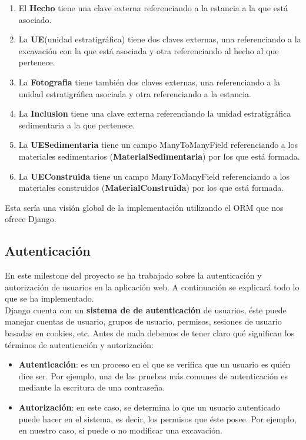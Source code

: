         \begin{enumerate}
            \item El \textbf{Hecho} tiene una clave externa referenciando a la estancia a la
            que está asociado.
            \item La \textbf{UE}(unidad estratigráfica) tiene dos claves externas, una
            referenciando a la excavación con la que está asociada y otra referenciando al
            hecho al que pertenece.
            \item La \textbf{Fotografia} tiene también dos claves externas, una referenciando
            a la unidad estratigráfica asociada y otra referenciando a la estancia.
            \item La \textbf{Inclusion} tiene una clave externa referenciando la unidad
            estratigráfica sedimentaria a la que pertenece.
            \item La \textbf{UESedimentaria} tiene un campo ManyToManyField referenciando a
            los materiales sedimentarios (\textbf{MaterialSedimentaria}) por los que está
            formada.
            \item La \textbf{UEConstruida} tiene un campo ManyToManyField referenciando a
            los materiales construidos (\textbf{MaterialConstruida}) por los que está
            formada.
        \end{enumerate}

    Esta sería una visión global de la implementación utilizando el ORM que nos ofrece Django.

\subsection{Autenticación}
En este milestone del proyecto se ha trabajado sobre la autenticación y autorización de
usuarios en la aplicación web. A continuación se explicará todo lo que se ha
implementado.\\

Django cuenta con un \textbf{sistema de de autenticación} \cite{django-auth} de usuarios,
éste puede manejar cuentas de usuario, grupos de usuario, permisos, sesiones de usuario
basadas en cookies, etc. Antes de nada debemos de tener claro qué significan los términos
de autenticación y autorización:

    \begin{itemize}
        \item \textbf{Autenticación}: es un proceso en el que se verifica que un usuario
        es quién dice ser. Por ejemplo, una de las pruebas más comunes de autenticación
        es mediante la escritura de una contraseña.
        \item \textbf{Autorización}: en este caso, se determina lo que un usuario
        autenticado puede hacer en el sistema, es decir, los permisos que éste posee. Por
        ejemplo, en nuestro caso, si puede o no modificar una excavación.
    \end{itemize}

